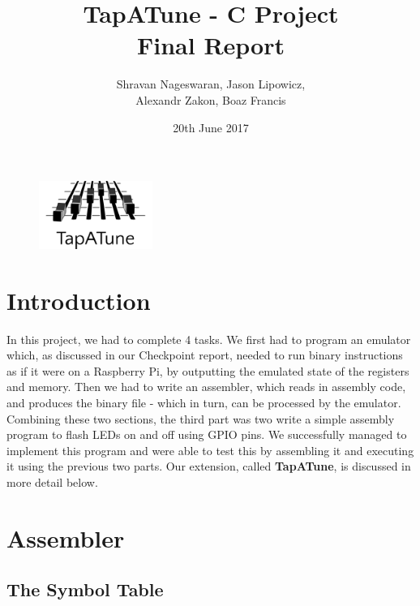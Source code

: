 \documentclass[11pt]{article}
\begin{document}
\title{\textbf{TapATune - C Project \\Final Report}}
\author{Shravan Nageswaran, Jason Lipowicz,\\ Alexandr Zakon, Boaz Francis}
\date{20th June 2017}
\begin{figure}
\begin{center}
  \includegraphics[width=10em]{logo}
  \vspace{-3em}
\end{center}
\end{figure}

\maketitle

\vspace{-0.3in}

\section{Introduction}

In this project, we had to complete 4 tasks. We first had to program an emulator which, as discussed in our Checkpoint report, needed to run binary instructions as if it were on a Raspberry Pi, by outputting the emulated state of the registers and memory. Then we had to write an assembler, which reads in assembly code, and produces the binary file - which in turn, can be processed by the emulator. Combining these two sections, the third part was two write a simple assembly program to flash LEDs on and off using GPIO pins. We successfully managed to implement this program and were able to test this by assembling it and executing it using the previous two parts. Our extension, called \textbf{TapATune}, is discussed in more detail below.

\section{Assembler}

\subsection{The Symbol Table}
\end{document}
